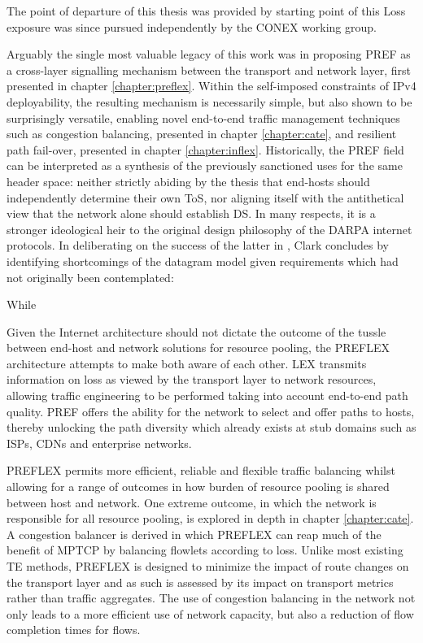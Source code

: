 The point of departure of this thesis was provided by 
starting point of this 
Loss exposure was since pursued independently by the \ac{CONEX} working group.

Arguably the single most valuable legacy of this work was in proposing \acf{PREF} as a cross-layer signalling mechanism between the transport and network layer, first presented in chapter \ref{chapter:preflex}.
Within the self-imposed constraints of \ac{IPv4} deployability, the resulting mechanism is necessarily simple, but also shown to be surprisingly versatile, enabling novel end-to-end traffic management techniques such as congestion balancing, presented in chapter \ref{chapter:cate}, and resilient path fail-over, presented in chapter \ref{chapter:inflex}.
Historically, the \ac{PREF} field can be interpreted as a synthesis of the previously sanctioned uses for the same header space: neither strictly abiding by the thesis that end-hosts should independently determine their own \acf{ToS}, nor aligning itself with the antithetical view that the network alone should establish \acf{DS}.
In many respects, it is a stronger ideological heir to the original design philosophy of the \ac{DARPA} internet protocols. 
In deliberating on the success of the latter in \cite{Clark:1988p478}, Clark concludes by identifying shortcomings of the datagram model given requirements which had not originally been contemplated:

While







Given the Internet architecture should not dictate the outcome of the tussle between end-host and network solutions for resource pooling, the \ac{PREFLEX} architecture attempts to make both aware of each other.
\acf{LEX} transmits information on loss as viewed by the transport layer to network resources, allowing traffic engineering to be performed taking into account end-to-end path quality.
\acf{PREF} offers the ability for the network to select and offer paths to hosts, thereby unlocking the path diversity which already exists at stub domains such as \acp{ISP}, \acp{CDN} and enterprise networks.

\ac{PREFLEX} permits more efficient, reliable and flexible traffic balancing whilst allowing for a range of outcomes in how burden of resource pooling is shared between host and network.
One extreme outcome, in which the network is responsible for all resource pooling, is explored in depth in chapter \ref{chapter:cate}.
A congestion balancer is derived in which \ac{PREFLEX} can reap much of the benefit of \ac{MPTCP} by balancing flowlets according to loss.
Unlike most existing \ac{TE} methods, \ac{PREFLEX} is designed to minimize the impact of route changes on the transport layer and as such is assessed by its impact on transport metrics rather than traffic aggregates.
The use of congestion balancing in the network not only leads to a more efficient use of network capacity, but also a reduction of flow completion times for flows.

